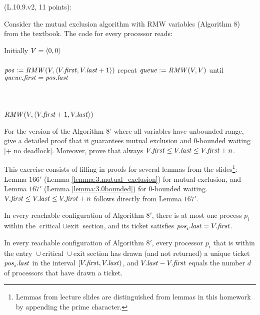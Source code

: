 \begin{Exc}{(L.10.9.v2, 11 points):}

Consider the mutual exclusion algorithm with RMW variables
(Algorithm 8) from the textbook. The code for every processor
reads:

\begin{code}%
\vspace*{-1cm}%
Initially $V=\langle 0,0 \rangle$\\
\\
\NL
\> $\mathit{pos} := \mathit{RMW}(V,\langle V.\mathit{first},V.\mathit{last}+1 \rangle)$\NL
\> repeat\NL
\>\> $\mathit{queue} := \mathit{RMW}(V,V)$\NL
\> until $\mathit{queue}.\mathit{first} = \mathit{pos}.\mathit{last}$\\
\\
\\
\\
\NL
\> $\mathit{RMW}(V,\langle V.\mathit{first}+1,V.\mathit{last} \rangle)$
\end{code}

For the version of the Algorithm 8' where all variables have unbounded
range, give a detailed proof that it guarantees mutual exclusion and
0-bounded waiting [+ no deadlock]. Moreover, prove that always
$V.\mathit{first} \leq V.\mathit{last} \leq V.\mathit{first}+n$.
\end{Exc}

This exercise consists of filling in proofs for several lemmas from the 
slides\footnote{Lemmas from lecture slides are distinguished from lemmas in this
homework by appending the prime character.}:
Lemma $166'$ (Lemma \ref{lemma:3.mutual_exclusion}) for mutual exclusion,
and Lemma $167'$ (Lemma \ref{lemma:3.0bounded}) for 0-bounded waiting. 
$V.\mathit{first} \leq V.\mathit{last} \leq V.\mathit{first}+n$ follows directly from Lemma $167'$.

\begin{lemma} \label{lemma:3.mutual_exclusion}
In every reachable configuration of Algorithm $8'$, there is at most one process
$p_i$ within the $\text{critical } \cup \text{exit}$ section, and its ticket
satisfies $\mathit{pos}_i.\mathit{last} = V.\mathit{first}$.
\end{lemma}


\begin{lemma} \label{lemma:3.0bounded}
In every reachable configuration of Algorithm $8'$, every processor $p_i$
that is within the $\text{entry } \cup \text{critical } \cup \text{exit}$
section has drawn (and not returned) a unique ticket $\mathit{pos}_i.\mathit{last}$ in the
interval $[V.\mathit{first}, V.\mathit{last})$, and $V.\mathit{last} - V.\mathit{first}$ equals the number
$d$ of processors that have drawn a ticket.
\end{lemma}

